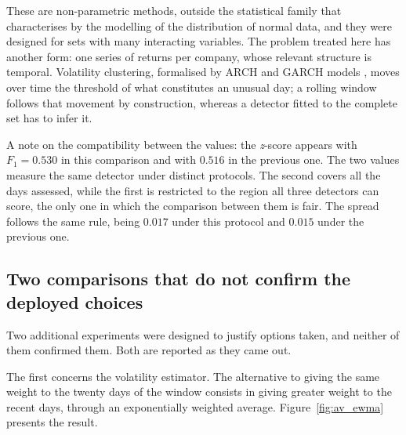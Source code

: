 These are non-parametric methods, outside the statistical family that
\textcite{chandola2009anomaly} characterises by the modelling of the distribution of normal data,
and they were designed for sets with many interacting variables. The problem treated here has
another form: one series of returns per company, whose relevant structure is temporal. Volatility
clustering, formalised by \gls{ARCH} and \gls{GARCH} models \autocite{engle1982arch,
bollerslev1986garch}, moves over time the threshold of what constitutes an unusual day; a rolling
window follows that movement by construction, whereas a detector fitted to the complete set has to
infer it.

A note on the compatibility between the values: the \emph{z}-score appears with $F_1 = 0.530$ in
this comparison and with $0.516$ in the previous one. The two values measure the same detector
under distinct protocols. The second covers all the days assessed, while the first is restricted to
the region all three detectors can score, the only one in which the comparison between them is
fair. The spread follows the same rule, being $0.017$ under this protocol and $0.015$ under the
previous one.

\subsection{Two comparisons that do not confirm the deployed choices}

Two additional experiments were designed to justify options taken, and neither of them confirmed
them. Both are reported as they came out.

The first concerns the volatility estimator. The alternative to giving the same weight to the
twenty days of the window consists in giving greater weight to the recent days, through an
exponentially weighted average. Figure~\ref{fig:av_ewma} presents the result.


